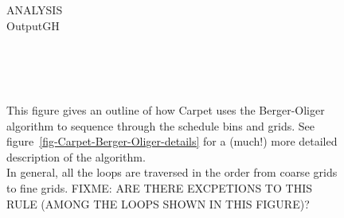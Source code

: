 \documentclass{article}
\def\thorn#1{\textbf{#1}}
\begin{document}
\begin{figure}[bp]
\begin{center}
{{\begin{minipage}[t]{0.87\textwidth}
ANALYSIS\\
OutputGH
\end{minipage}}}
\\
\\
\\
\end{center}
\caption[Summary of the \thorn{Carpet} schedule]
	{
	This figure gives an outline of how Carpet uses the
	Berger-Oliger algorithm to sequence through the
	schedule bins and grids.
	See figure~\protect\ref{fig-Carpet-Berger-Oliger-details}
	for a (much!) more detailed description of the algorithm.	\\
	In general, all the loops are traversed in the order
	from coarse grids to fine grids.
	FIXME: ARE THERE EXCPETIONS TO THIS RULE
	(AMONG THE LOOPS SHOWN IN THIS FIGURE)?
	}
\label{fig-Carpet-Berger-Oliger-summary}
\end{figure}
\end{document}
